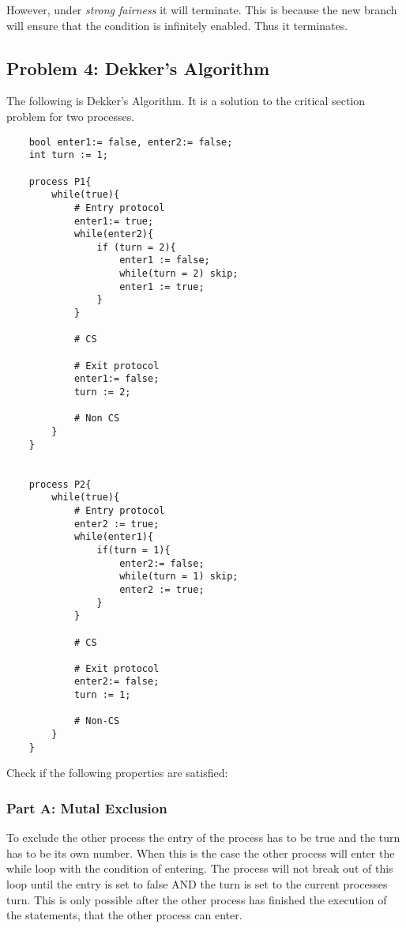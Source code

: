 However, under \textit{strong fairness} it will terminate. This is because the new branch will ensure that the condition is infinitely enabled. 
Thus it terminates. 


\subsection{Problem 4: Dekker's Algorithm}

The following is Dekker's Algorithm. It is a solution to the critical section problem for two processes. 

\begin{lstlisting}
    bool enter1:= false, enter2:= false; 
    int turn := 1;

    process P1{
        while(true){
            # Entry protocol
            enter1:= true;
            while(enter2){
                if (turn = 2){
                    enter1 := false;
                    while(turn = 2) skip;
                    enter1 := true;
                }
            }

            # CS

            # Exit protocol
            enter1:= false; 
            turn := 2; 

            # Non CS
        }
    }


    process P2{
        while(true){
            # Entry protocol
            enter2 := true;
            while(enter1){
                if(turn = 1){
                    enter2:= false;
                    while(turn = 1) skip;
                    enter2 := true;
                }
            }

            # CS 

            # Exit protocol 
            enter2:= false; 
            turn := 1;

            # Non-CS
        }
    }
\end{lstlisting}


Check if the following properties are satisfied: 

\subsubsection{Part A: Mutal Exclusion}

To exclude the other process the entry of the process has to be true and the turn has to be its own number. 
When this is the case the other process will enter the while loop with the condition of entering. 
The process will not break out of this loop until the entry is set to false AND the turn is set to the current processes turn. 
This is only possible after the other process has finished the execution of the statements, that the other process can enter. 

